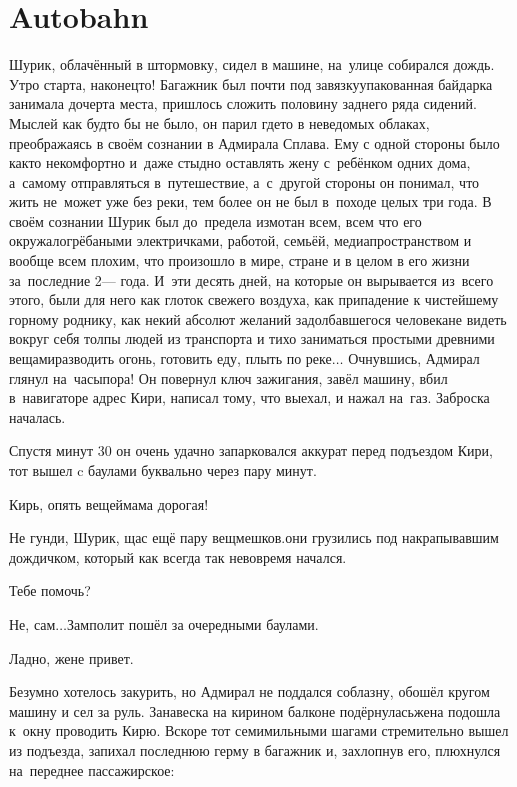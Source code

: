 \chapter{Autobahn}
\vepsianrose

Шурик, облачённый в штормовку, сидел в машине, на~улице собирался дождь. Утро старта, наконец\sdash то! Багажник был почти под завязку\mdash упакованная байдарка занимала дочерта места, пришлось сложить половину заднего ряда сидений. Мыслей как будто бы не было, он парил где\sdash то в неведомых облаках, преображаясь в своём сознании в Адмирала Сплава. Ему с одной стороны было как\sdash то некомфортно и~даже стыдно оставлять жену с~ребёнком одних дома, а~самому отправляться в~путешествие, а~с~другой стороны он понимал, что жить не~может уже без реки, тем более он не был в~походе целых три года. В своём сознании Шурик был до~предела измотан всем, всем что его окружало\mdash грёбаными электричками, работой, семьёй, медиапространством и вообще всем плохим, что произошло в мире, стране и в целом в его жизни за~последние 2\thinspace\nobreakdash--- года. И~эти десять дней, на которые он вырывается из~всего этого, были для него как глоток свежего воздуха, как припадение к чистейшему горному роднику, как некий абсолют желаний задолбавшегося человека\mdash не видеть вокруг себя толпы людей из транспорта и тихо заниматься простыми древними вещами\mdash разводить огонь, готовить еду, плыть по реке$\ldots$ Очнувшись, Адмирал глянул на~часы\mdash пора! Он повернул ключ зажигания, завёл машину, вбил в~навигаторе адрес Кири, написал тому, что выехал, и нажал на~газ. Заброска началась.

Спустя минут 30 он очень удачно запарковался аккурат перед подъездом Кири, тот вышел c баулами буквально через пару минут.

\diagdash Кирь, опять вещей\mdash мама дорогая!

\diagdash Не гунди, Шурик, щас ещё пару вещмешков.\mdash они грузились под накрапывавшим дождичком, который как всегда так невовремя начался.

\diagdash Тебе помочь?

\diagdash Не, сам$\ldots$\mdash Замполит пошёл за очередными баулами.

\diagdash Ладно, жене привет.

Безумно хотелось закурить, но Адмирал не поддался соблазну, обошёл кругом машину и сел за руль. Занавеска на кирином балконе подёрнулась\mdash жена подошла к~окну проводить Кирю. Вскоре тот семимильными шагами стремительно вышел из подъезда, запихал последнюю герму в багажник и, захлопнув его, плюхнулся на~переднее пассажирское:

